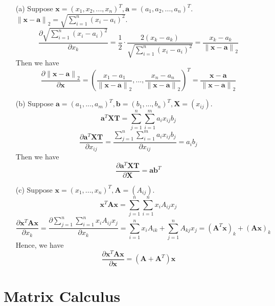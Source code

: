 \documentclass[12pt,a4paper]{article}
\begin{document}
\begin{enumerate}
    \item[(a)]
        Suppose $\mathbf{x} = (x_{1}, x_{2}, ..., x_{n})^{T}, \mathbf{a} = (a_{1}, a_{2}, ..., a_{n})^{T}$. $\left\lVert \mathbf{x} - \mathbf{a} \right\rVert _{2} = \sqrt{\sum_{i = 1}^{n} (x_{i} - a_{i})^{2}}  $.
        \[
            \frac{\partial \sqrt{\sum_{i = 1}^{n} (x_{i} - a_{i})^{2}}}{\partial x_{k}} = \frac{1}{2}\cdot \frac{2(x_{k} - a_{k})}{\sqrt{\sum_{i = 1}^{n} (x_{i} - a_{i})^{2}}} = \frac{x_{k} - a_{k}}{\left\lVert \mathbf{x} - \mathbf{a} \right\rVert _{2}}
        \]
        Then we have 
        \[
            \frac{\partial \left\lVert \mathbf{x} - \mathbf{a} \right\rVert _{2}}{\partial \mathbf{x}} = (\frac{x_{1} - a_{1}}{\left\lVert \mathbf{x} - \mathbf{a} \right\rVert _{2}}, ..., \frac{x_{n} - a_{n}}{\left\lVert \mathbf{x} - \mathbf{a} \right\rVert _{2}})^{T} = \frac{\mathbf{x} - \mathbf{a}}{\left\lVert \mathbf{x} - \mathbf{a} \right\rVert _{2}}
        \]
    \item[(b)]
        Suppose $\mathbf{a} = (a_{1}, ..., a_{m})^{T}, \mathbf{b} = (b_{1}, ..., b_{n})^{T}, \mathbf{X} = (x_{ij})$. 
        \[
            \mathbf{a}^{T}\mathbf{X}\mathbf{T} = \sum_{j=1}^{n}\sum_{i=1}^{m}a_{i}x_{ij}b_{j}
        \]
        \[
            \frac{\partial \mathbf{a}^{T}\mathbf{X}\mathbf{T}}{\partial x_{ij}} = \frac{\sum_{j=1}^{n}\sum_{i=1}^{m}a_{i}x_{ij}b_{j}}{\partial x_{ij}} = a_{i}b_{j}
        \]
        Then we have
        \[
            \frac{\partial \mathbf{a}^{T}\mathbf{X}\mathbf{T}}{\partial \mathbf{X}} = \mathbf{a}\mathbf{b}^{T}
        \]
    \item[(c)]
        Suppose $\mathbf{x} = (x_{1}, ..., x_{n})^{T}, \mathbf{A} = (A_{ij})$.
        \[
            \mathbf{x}^{T}\mathbf{A}\mathbf{x} = \sum_{j=1}^{n}\sum_{i=1}^{n}x_{i}A_{ij}x_{j}
        \] 
        \[
            \frac{\partial \mathbf{x}^{T}\mathbf{A}\mathbf{x}}{\partial x_{k}} = \frac{\partial \sum_{j=1}^{n}\sum_{i=1}^{n}x_{i}A_{ij}x_{j}}{\partial x_k} = \sum_{i=1}^{n}x_{i}A_{ik} + \sum_{j=1}^{n}A_{kj}x_{j} = (\mathbf{A}^{T}\mathbf{x})_{k} + (\mathbf{A} \mathbf{x})_{k}
        \]
        Hence, we have
        \[
            \frac{\partial \mathbf{x}^{T}\mathbf{A}\mathbf{x}}{\partial \mathbf{x}} = (\mathbf{A} + \mathbf{A}^{T}) \mathbf{x}
        \]
    
\end{enumerate}

\section{Matrix Calculus}    
\end{document}
